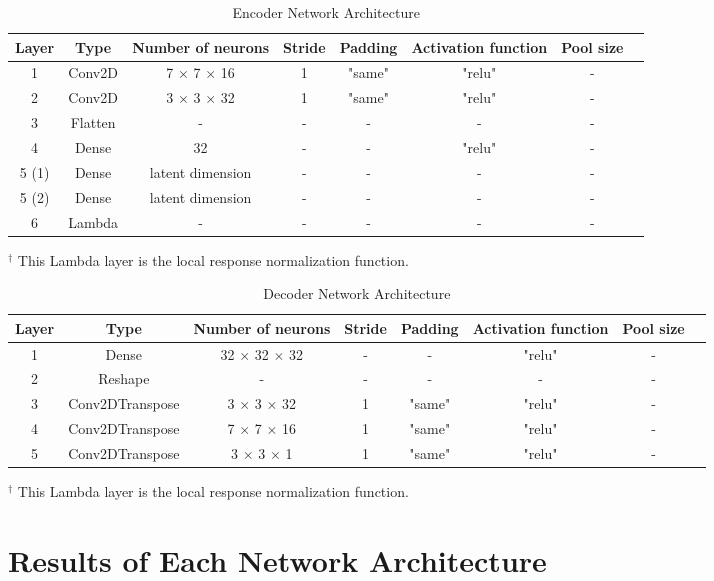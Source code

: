 \documentclass[12pt]{amsart}
\begin{document}
{\begin{enumerate}
		\begin{table}[h]
		\caption{Encoder Network Architecture}
		\begin{tabular}{c c c c c c c c}
		\hline
		Layer & Type & Number of neurons & Stride & Padding & Activation function & Pool size\\
		\hline
		1 & Conv2D & 7 $\times$ 7 $\times$ 16 & 1 & "same" & "relu" & - \\
		2 & Conv2D & 3 $\times$ 3 $\times$ 32 & 1 & "same" & "relu" & - \\
		3 & Flatten & - & - & - & - & -\\
		4 & Dense & 32 & - & - & "relu" & -\\
		5 (1) & Dense & latent dimension & - & - & - & - \\
		5 (2) & Dense & latent dimension & - & - & - & -\\
		6 & Lambda  & - & - & - & - & -\\
		\hline 
		\end{tabular}
		\end{table}

		$^{\dagger}$ This Lambda layer is the local response normalization function.

		\begin{table}[h]
		\caption{Decoder Network Architecture}
		\begin{tabular}{c c c c c c c c}
		\hline
		Layer & Type & Number of neurons & Stride & Padding & Activation function & Pool size\\
		\hline
		1 & Dense & 32 $\times$ 32 $\times$ 32 & - & - & "relu" & -\\
		2 & Reshape & - & - & - & - & - \\
		3 & Conv2DTranspose & 3 $\times$ 3 $\times$ 32 & 1 & "same" & "relu" & - \\
		4 & Conv2DTranspose & 7 $\times$ 7 $\times$ 16 & 1 & "same" & 
		"relu" & - \\
		5 & Conv2DTranspose & 3 $\times$ 3 $\times$ 1 & 1 & "same" & "relu" & - \\
		\hline 
		\end{tabular}
		\end{table}

		$^{\dagger}$ This Lambda layer is the local response normalization function.

\end{enumerate}

\section{Results of Each Network Architecture} 

}
\end{document}
